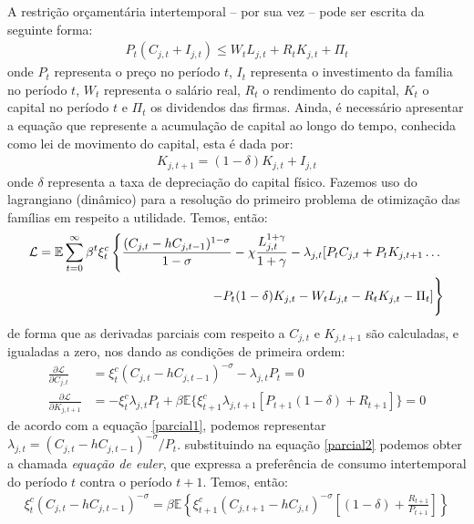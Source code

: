 \documentclass[10pt,a4paper]{article}
\begin{document}
A restrição orçamentária intertemporal -- por sua vez -- pode ser escrita da seguinte forma:
\begin{align*}
P_t(C_{j,t} + I_{j,t}) \leq W_t L_{j,t} + R_t K_{j,t} + \Pi_t
\end{align*}
\noindent
onde $P_t$ representa o preço no período $t$, $I_{t}$ representa o investimento da família no período $t$, $W_t$ representa o salário real, $R_t$ o rendimento do capital, $K_t$ o capital no período $t$ e $\Pi_t$ os dividendos das firmas. Ainda, é necessário apresentar a equação que represente a acumulação de capital ao longo do tempo, conhecida como lei de movimento do capital, esta é dada por:
\begin{align}
K_{j,t+1} = (1-\delta)K_{j,t} + I_{j,t}	
\end{align}
\noindent
onde $\delta$ representa a taxa de depreciação do capital físico. Fazemos uso do lagrangiano (dinâmico) para a resolução do primeiro problema de otimização das famílias em respeito a utilidade. Temos, então:
\begin{align*}
\mathcal{L} = \mathbb{E}\sum_{t=0}^{\infty}\beta^{t}\xi_{t}^{c} \left\{ \frac{(C_{j,t} - hC_{j,t-1})^{1-\sigma}}{1-\sigma} - \chi \frac{L_{j,t}^{1 + \gamma}}{1 + \gamma} - \lambda_{j,t}[P_tC_{j,t} + P_tK_{j,t+1} \dots \right. \\
 \left. - P_t(1-\delta)K_{j,t} - W_t L_{j,t} - R_t K_{j,t} - \Pi_t] \vphantom{\frac{L_{j,t}^{1 + \gamma}}{1 + \gamma}}   \right\}
\end{align*}
\noindent
de forma que as derivadas parciais com respeito a $C_{j,t}$ e $K_{j,t+1}$ são calculadas, e igualadas a zero, nos dando as condições de primeira ordem:
\begin{align} \label{parcial1}
\frac{\partial \mathcal{L}}{\partial C_{j,t}} &= \xi_{t}^{c}(C_{j,t} - hC_{j,t-1})^{-\sigma} - \lambda_{j,t}P_t = 0 \\ \label{parcial2}
\frac{\partial \mathcal{L}}{\partial K_{j,t+1}} &= -\xi_{t}^{c}\lambda_{j,t}P_t + \beta \mathbb{E}\{\xi_{t+1}^{c}\lambda_{j,t+1}[P_{t+1}(1 - \delta) + R_{t+1}]\} = 0
\end{align}
\noindent
de acordo com a equação \ref{parcial1}, podemos representar $\lambda_{j,t} = (C_{j,t} - hC_{j,t-1})^{-\sigma}/P_t$. substituindo na equação \ref{parcial2} podemos obter a chamada \textit{equação de euler}, que expressa a preferência de consumo intertemporal do período $t$ contra o período $t+1$. Temos, então:
\begin{align}\label{euler}
\xi_{t}^{c}(C_{j,t} - hC_{j,t-1})^{-\sigma} = \beta \mathbb{E}\left\{ \xi_{t+1}^{c}(C_{j,t+1} - hC_{j,t})^{-\sigma}\left[(1-\delta) + \frac{R_{t+1}}{P_{t+1}}\right] \right\}
\end{align}
\end{document}
